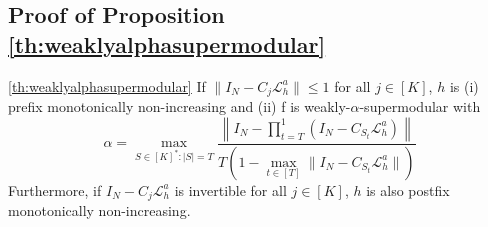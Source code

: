 \documentclass{article} %
\begin{document}
\subsection{Proof of Proposition \ref{th:weaklyalphasupermodular}} \label{sec:proofweaklyalphasupermodular}

\begin{customproposition}{\ref{th:weaklyalphasupermodular}}
    If $\|I_N - C_j\mathcal{L}_h^a\| \leq 1$ for all $j \in [K]$, $h$ is (i) prefix monotonically non-increasing and (ii) f is weakly-$\alpha$-supermodular with $$\alpha = \max_{S \in [K]^*: |S| = T}\frac{\left\|I_N - \prod_{t = T}^{1}\left(I_N - C_{S_t}\mathcal{L}_h^a\right)\right\|}{T\left(1 - \max_{t \in [T]}\|I_N - C_{S_t}\mathcal{L}_h^a\|\right) }$$Furthermore, if $I_N - C_j\mathcal{L}_h^a$ is invertible for all $j \in [K]$, $h$ is also postfix monotonically non-increasing.
\end{customproposition}
\end{document}
